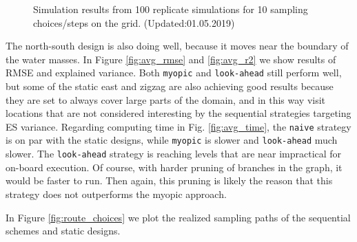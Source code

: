 \documentclass[aoas]{imsart}
\begin{document}
\begin{figure}[!th]
\caption{Simulation results from 100 replicate simulations for 10
  sampling choices/steps on the grid. (Updated:01.05.2019)} 
\label{fig:sim_results}
\end{figure}

The north-south design is also doing well, because it moves near the
boundary of the water masses. In Figure \ref{fig:avg_rmse} and
\ref{fig:avg_r2} we show results of RMSE and explained variance. Both
\texttt{myopic} and \texttt{look-ahead} still perform well, but some of
the static east and zigzag are also achieving good results because they
are set to always cover large parts of the domain, and in this way visit
locations that are not considered interesting by the sequential
strategies targeting ES variance. Regarding computing time in Fig.
\ref{fig:avg_time}, the \texttt{naive} strategy is on par with the
static designs, while \texttt{myopic} is slower and \texttt{look-ahead}
much slower. The \texttt{look-ahead} strategy is reaching levels that
are near impractical for on-board execution. Of course, with harder
pruning of branches in the graph, it would be faster to run. Then again,
this pruning is likely the reason that this strategy does not
outperforms the myopic approach.

In Figure \ref{fig:route_choices} we plot the realized sampling paths of
the sequential schemes and static designs.
\end{document}
